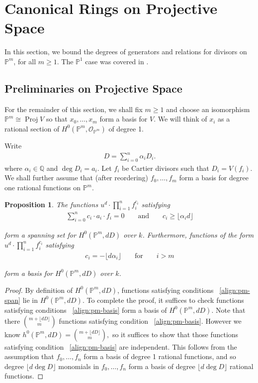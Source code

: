 \documentclass{amsart}
\theoremstyle{plain}
\newtheorem{prop}[thm]{Proposition}
\theoremstyle{definition}
\theoremstyle{remark}
\numberwithin{equation}{section}
\newcommand\ssec{\subsection}
\newcommand\bq{{\mathbb Q}}
\newcommand\bp{{\mathbb P}}
\newcommand\sco{{\mathscr O}}
\newcommand\bida{a}
\DeclareMathOperator{\proj}{Proj}
\begin{document}
\section{Canonical Rings on Projective Space}
In this section, we bound the degrees of generators and relations for divisors on $\bp^m$, for all $m \geq 1$. The $\bp^1$ case was covered in \cite{dorney:canonical}.

\ssec{Preliminaries on Projective Space}

For the remainder of this section, we shall fix $m \geq 1$ and choose an isomorphism $\bp^m \cong \proj V$ so that $x_0,\ldots, x_m$ form a basis for $V$.  We will think of $x_i$ as a rational section of $H^0(\bp^m, \sco_{\bp^m})$ of degree 1.


Write
\begin{align*}
	D = \sum_{i=0}^{n}\alpha_i D_i.
\end{align*}
where $\alpha_i \in \bq$ and $\deg D_i = \bida_i$. Let $f_i$ be Cartier divisors such that $D_i = V(f_i)$. We shall further assume that (after reordering) $f_0,\ldots, f_{m}$ form a basis for degree one rational functions on $\bp^m$. 

\begin{prop}
\label{prop:pm-span-and-basis}
The functions $u^d \cdot \prod_{i=1}^n f_i^{c_i}$ satisfying
\begin{align}
\label{align:pm-span}
\sum_{i=0}^{n} c_i \cdot \bida_i \cdot f_i = 0 && \text{ and } &&c_i \geq \lfloor \alpha_i d\rfloor	
\end{align}

\noindent
form a spanning set for $H^0(\bp^m, dD)$ over $k$. Furthermore, functions 
of the form $u^d \cdot \prod_{i=1}^n f_i^{c_i}$ satisfying
\begin{align}
\label{align:pm-basis}
c_i = -\lfloor d\alpha_i \rfloor && \text{ for } && i > m
\end{align}

\noindent
form a basis for $H^0(\bp^m, dD)$ over $k$.
\end{prop}

\begin{proof}
By definition of $H^0(\bp^m,dD)$, functions satisfying conditions 
~\eqref{align:pm-span} lie in $H^0(\bp^m,dD)$. To complete the proof, it suffices to check functions satisfying conditions ~\eqref{align:pm-basis} form a basis of $H^0(\bp^m,dD)$. Note that there $\binom{m+ \lfloor dD \rfloor }{m}$ functions satisfying condition ~\eqref{align:pm-basis}. However we know $h^0(\bp^m,dD) = \binom{m+ \lfloor dD \rfloor }{m},$ so it suffices to show that those functions satisfying condition ~\eqref{align:pm-basis} are independent. This follows from the assumption that $f_0,\ldots, f_n$ form a basis of degree 1 rational functions, and so degree $\lfloor d \deg D \rfloor $ monomials in $f_0,\ldots, f_n$ form a basis of degree $\lfloor d \deg D \rfloor $ rational functions.
\end{proof}
\end{document}
